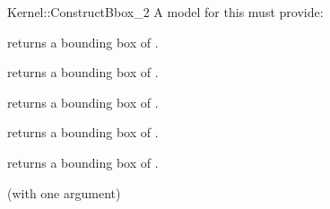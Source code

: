 \begin{ccRefFunctionObjectConcept}{Kernel::ConstructBbox_2}
A model for this must provide:



 {returns a bounding box of .}

 {returns a bounding box of .}

 {returns a bounding box of .}

 {returns a bounding box of .}

 {returns a bounding box of .}


\ccRefines
{} (with one argument)



\end{ccRefFunctionObjectConcept}
